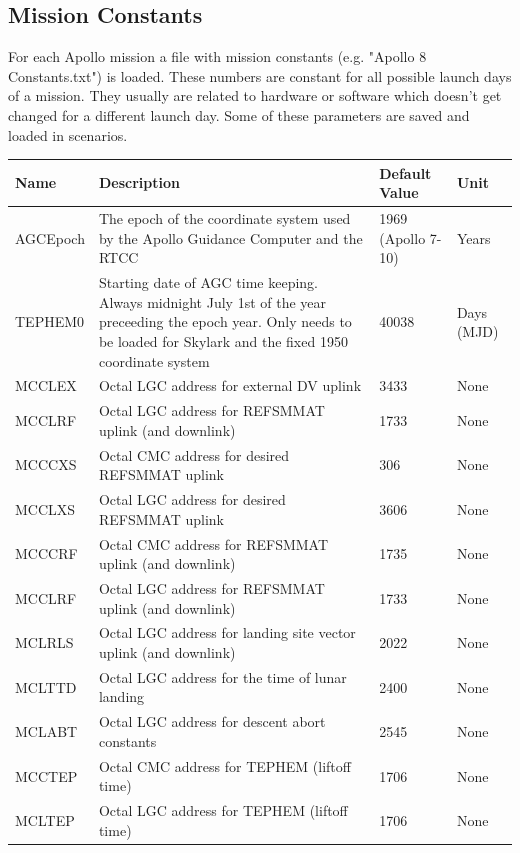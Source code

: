 \documentclass[11pt]{article} %
\begin{document}
\subsection{Mission Constants}

For each Apollo mission a file with mission constants (e.g. "Apollo 8 Constants.txt") is loaded. These numbers are constant for all possible launch days of a mission. They usually are related to hardware or software which doesn't get changed for a different launch day. Some of these parameters are saved and loaded in scenarios.\\

\begin{tabular}{L{3cm} L{7.5cm} L{2cm} L{1.5cm}}
\hline
\textbf{Name} & \textbf{Description} & \textbf{Default Value} & \textbf{Unit}\\
\hline
AGCEpoch & The epoch of the coordinate system used by the Apollo Guidance Computer and the RTCC& 1969 (Apollo 7-10) & Years\\
\hline
TEPHEM0 & Starting date of AGC time keeping. Always midnight July 1st of the year preceeding the epoch year. Only needs to be loaded for Skylark and the fixed 1950 coordinate system & 40038 & Days (MJD)\\
\hline
MCCLEX & Octal LGC address for external DV uplink & 3433 & None\\
\hline
MCCLRF & Octal LGC address for REFSMMAT uplink (and downlink)& 1733 & None\\
\hline
MCCCXS & Octal CMC address for desired REFSMMAT uplink & 306 & None\\
\hline
MCCLXS & Octal LGC address for desired REFSMMAT uplink & 3606 & None\\
\hline
MCCCRF & Octal CMC address for REFSMMAT uplink (and downlink) & 1735 & None\\
\hline
MCCLRF & Octal LGC address for REFSMMAT uplink (and downlink) & 1733 & None\\
\hline
MCLRLS & Octal LGC address for landing site vector uplink (and downlink) & 2022 & None\\
\hline
MCLTTD & Octal LGC address for the time of lunar landing & 2400 & None\\
\hline
MCLABT & Octal LGC address for descent abort constants & 2545 & None\\
\hline
MCCTEP & Octal CMC address for TEPHEM (liftoff time) & 1706 & None\\
\hline
MCLTEP & Octal LGC address for TEPHEM (liftoff time) & 1706 & None\\

\end{tabular}
\end{document}
